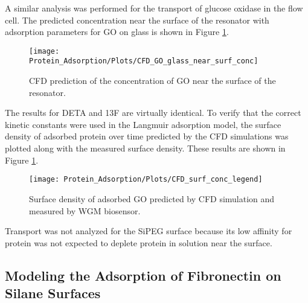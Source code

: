 A similar analysis was performed for the transport of glucose oxidase
in the flow cell. The predicted concentration near the surface of
the resonator with adsorption parameters for GO on glass is shown
in Figure \ref{fig:CFD GO near surf conc}.%
\begin{figure}
\texttt{[image: Protein\_Adsorption/Plots/CFD\_GO\_glass\_near\_surf\_conc]}

\caption{\label{fig:CFD GO near surf conc}CFD prediction of the concentration
of GO near the surface of the resonator.}
%
\end{figure}
 The results for DETA and 13F are virtually identical. To verify that
the correct kinetic constants were used in the Langmuir adsorption
model, the surface density of adsorbed protein over time predicted
by the CFD simulations was plotted along with the measured surface
density. These results are shown in Figure \ref{fig:CFD GO near surf conc}.%
\begin{figure}

\texttt{[image: Protein\_Adsorption/Plots/CFD\_surf\_conc\_legend]}\caption{\label{fig:CFD GO surface density}Surface density of adsorbed GO
predicted by CFD simulation and measured by WGM biosensor.}
%
\end{figure}
 Transport was not analyzed for the SiPEG surface because its low
affinity for protein was not expected to deplete protein in solution
near the surface.


\subsection{Modeling the Adsorption of Fibronectin on Silane Surfaces}

